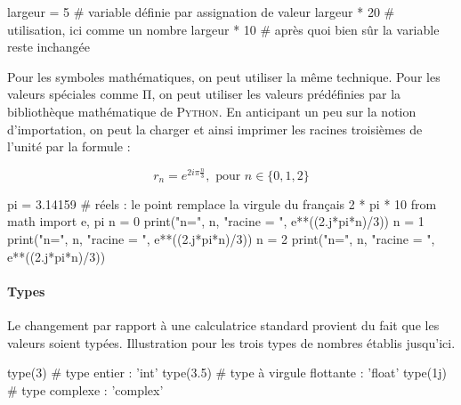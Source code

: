 \begin{idleconsole}[after skip=6pt]
	\begin{pyconsole}
	largeur = 5  # variable définie par assignation de valeur
	largeur * 20 # utilisation, ici comme un nombre
	largeur * 10 # après quoi bien sûr la variable reste inchangée
	\end{pyconsole}
\end{idleconsole}

Pour les symboles mathématiques, on peut utiliser la même technique. Pour les valeurs spéciales comme Π, on peut utiliser les valeurs prédéfinies par la bibliothèque mathématique de \textsc{Python}. En anticipant un peu sur la notion d'importation, on peut la charger et ainsi imprimer les racines troisièmes de l'unité par la formule :

\vspace*{-0.5\baselineskip}

\begin{equation}
r_n = e^{2i\pi \frac{n}{3}}, \mbox{ pour } n\in \{0,1,2\}
\end{equation}

\vspace*{0.225\baselineskip}

\begin{idleconsole}[after skip=7pt]
	\begin{pyconsole}
		pi = 3.14159  # réels : le point remplace la virgule du français
		2 * pi * 10
		from math import e, pi
		n = 0
		print("n=", n, "racine = ", e**((2.j*pi*n)/3))
		n = 1
		print("n=", n, "racine = ", e**((2.j*pi*n)/3))
		n = 2
		print("n=", n, "racine = ", e**((2.j*pi*n)/3))
	\end{pyconsole}
\end{idleconsole}

\paragraph{Types} Le changement par rapport à une calculatrice standard provient du fait que les valeurs soient typées. Illustration pour les trois types de nombres établis jusqu'ici.

\begin{idleconsole}[after skip=7pt]
	\begin{pyconsole}
		type(3)   # type entier : 'int'
		type(3.5) # type à virgule flottante : 'float'
		type(1j)  # type complexe : 'complex'
	\end{pyconsole}
\end{idleconsole}


